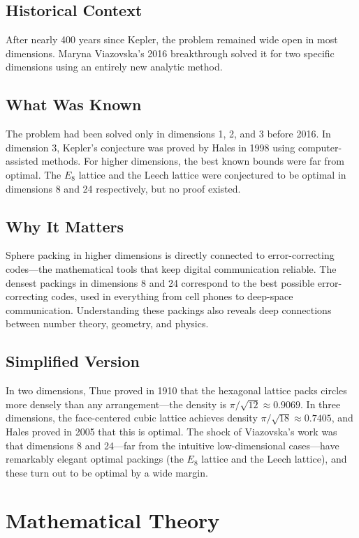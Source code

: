 \subsection{Historical Context}
After nearly 400 years since Kepler, the problem remained wide open in most dimensions. Maryna Viazovska's 2016 breakthrough solved it for two specific dimensions using an entirely new analytic method.

\subsection{What Was Known}
The problem had been solved only in dimensions 1, 2, and 3 before 2016. In dimension 3, Kepler's conjecture was proved by Hales in 1998 using computer-assisted methods. For higher dimensions, the best known bounds were far from optimal. The $E_8$ lattice and the Leech lattice were conjectured to be optimal in dimensions 8 and 24 respectively, but no proof existed.

\subsection{Why It Matters}
Sphere packing in higher dimensions is directly connected to error-correcting codes---the mathematical tools that keep digital communication reliable. The densest packings in dimensions 8 and 24 correspond to the best possible error-correcting codes, used in everything from cell phones to deep-space communication. Understanding these packings also reveals deep connections between number theory, geometry, and physics.

\subsection{Simplified Version}
In two dimensions, Thue proved in 1910 that the hexagonal lattice packs circles more densely than any arrangement---the density is $\pi/\sqrt{12} \approx 0.9069$. In three dimensions, the face-centered cubic lattice achieves density $\pi/\sqrt{18} \approx 0.7405$, and Hales proved in 2005 that this is optimal. The shock of Viazovska's work was that dimensions 8 and 24---far from the intuitive low-dimensional cases---have remarkably elegant optimal packings (the $E_8$ lattice and the Leech lattice), and these turn out to be optimal by a wide margin.

\section{Mathematical Theory}


